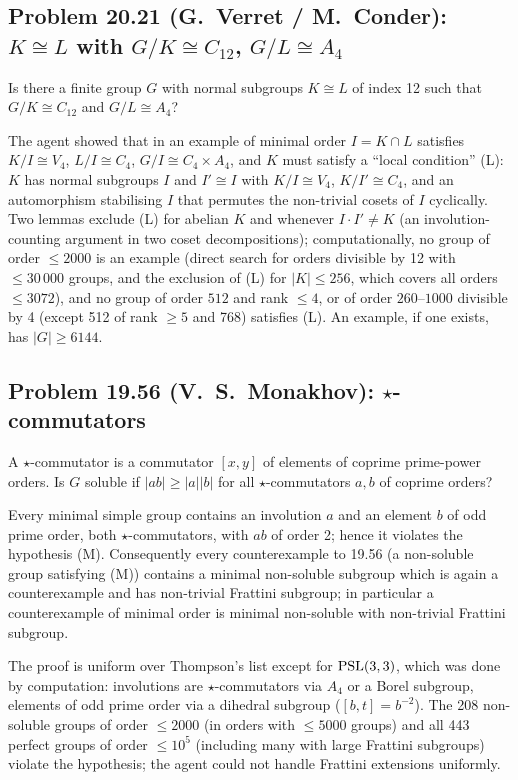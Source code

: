 \subsection{Problem 20.21 (G.~Verret / M.~Conder): $K\cong L$ with $G/K\cong C_{12}$, $G/L\cong A_4$}
\begin{problem}[20.21]
Is there a finite group $G$ with normal subgroups $K\cong L$ of index 12 such that $G/K\cong C_{12}$ and
$G/L\cong A_4$?
\end{problem}
The agent showed that in an example of minimal order $I=K\cap L$ satisfies $K/I\cong V_4$, $L/I\cong C_4$, $G/I\cong C_4\times A_4$,
and $K$ must satisfy a ``local condition'' (L): $K$ has normal subgroups $I$ and $I'\cong I$ with $K/I\cong V_4$,
$K/I'\cong C_4$, and an automorphism stabilising $I$ that permutes the non-trivial cosets of $I$ cyclically. Two
lemmas exclude (L) for abelian $K$ and whenever $I\cdot I'\ne K$ (an involution-counting argument in two coset
decompositions); computationally, no group of order $\le 2000$ is an example (direct search for orders divisible by 12 with
$\le 30\,000$ groups, and the exclusion of (L) for $|K|\le 256$, which covers all orders $\le 3072$), and no group
of order $512$ and rank $\le 4$, or of order $260$--$1000$ divisible by 4 (except 512 of rank $\ge 5$ and 768)
satisfies (L). An example, if one exists, has $|G|\ge 6144$.

\subsection{Problem 19.56 (V.~S.~Monakhov): $\star$-commutators}
\begin{problem}[19.56]
A $\star$-commutator is a commutator $[x,y]$ of elements of coprime prime-power orders. Is $G$ soluble if
$|ab|\ge|a||b|$ for all $\star$-commutators $a,b$ of coprime orders?
\end{problem}
\begin{theorem}\label{thm:1956}
Every minimal simple group contains an involution $a$ and an element $b$ of odd prime order, both
$\star$-commutators, with $ab$ of order 2; hence it violates the hypothesis (M). Consequently every
counterexample to 19.56 (a non-soluble group satisfying (M)) contains a minimal non-soluble subgroup which is
again a counterexample and has non-trivial Frattini subgroup; in particular a counterexample of minimal order is
minimal non-soluble with non-trivial Frattini subgroup.
\end{theorem}
The proof is uniform over Thompson's list except for $\mathrm{PSL}(3,3)$, which was done by computation: involutions are
$\star$-commutators via $A_4$ or a Borel subgroup, elements of odd prime order via a dihedral subgroup
($[b,t]=b^{-2}$). The 208 non-soluble groups of order $\le 2000$ (in orders with $\le 5000$ groups) and all 443
perfect groups of order $\le 10^5$ (including many with large Frattini subgroups) violate the
hypothesis; the agent could not handle Frattini extensions uniformly.

